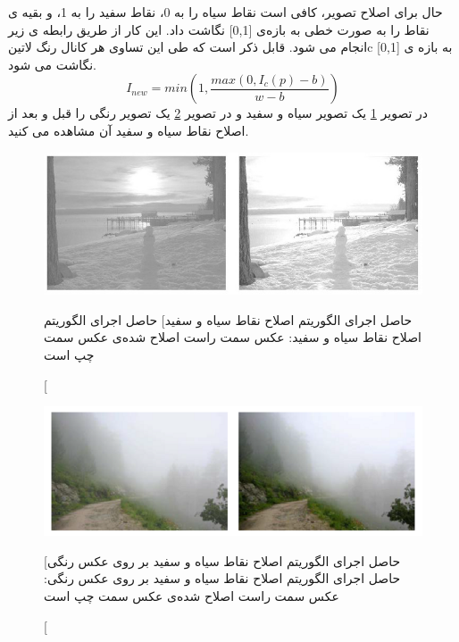 حال برای اصلاح تصویر، کافی است نقاط سیاه را به 0، نقاط سفید را به 1، و بقیه ی نقاط را به  صورت خطی به  بازه‌ی [0,1]  نگاشت داد. این کار از طریق رابطه ی زیر انجام می شود. قابل ذکر است که طی این تساوی هر کانال رنگ 
‌لاتین{c  }
به بازه ی [0,1] نگاشت می شود.
\begin{equation}
I_{new} = min(1, \frac{max(0, I_{c}(p) - b)}{w - b})
\end{equation}
در تصویر
\ref{fig:bwcorrection}
 یک تصویر سیاه و سفید و در تصویر 
\ref{fig:bwcorrection2}
  یک تصویر رنگی  را قبل و بعد از اصلاح نقاط سیاه و سفید آن مشاهده می کنید.
\begin{figure}[!htb]

 		\includegraphics[width=\linewidth]{images/bwcorrection}

 		\caption

 		[حاصل اجرای الگوریتم اصلاح نقاط سیاه و سفید]
 		{
حاصل اجرای الگوریتم اصلاح نقاط سیاه و سفید: عکس سمت راست اصلاح شده‌ی عکس سمت چپ است
}\label{fig:bwcorrection}
 		\endminipage\hfill

 		
\end{figure}
 \begin{figure}[!tb]

 		\includegraphics[width=\linewidth]{images/bwcorrection2}

 	\caption
 	[حاصل اجرای الگوریتم اصلاح نقاط سیاه و سفید بر روی عکس رنگی]
{حاصل اجرای الگوریتم اصلاح نقاط سیاه و سفید بر روی عکس رنگی: عکس سمت راست اصلاح شده‌ی عکس سمت چپ است}
 	\label{fig:bwcorrection2}
 	\endminipage\hfill
 \end{figure}